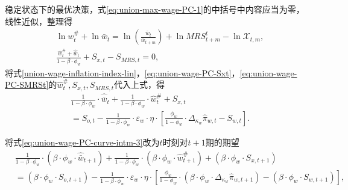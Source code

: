 稳定状态下的最优决策，式\eqref{eq:union-max-wage-PC-1}的中括号中内容应当为零，线性近似，整理得
\begin{align}
&\ln w^{\#}_t + \ln \bar{w}_t  = \ln \left(\frac{\bar{w}_t}{\bar{w}_{t+m}}\right) + \ln MRS_{t+m}^{t} -\ln \mathcal{X}_{t,m}, \nonumber \\
\label{eq:union-wage-PC-curve-intm-2}
&\frac{\hat{w}^{\#}_t + \hat{\bar{w}}_t}{1-\beta \cdot \phi_w}  + S_{x,t} - S_{MRS,t} = 0,
\end{align}
将式\eqref{union-wage-inflation-index-lin}，\eqref{eq:union-wage-PC-Sxt}，\eqref{eq:union-wage-PC-SMRSt}的$\hat{w}^{\#}_t, S_{x,t}, S_{MRS,t}$代入上式，得
\begin{equation}
\label{eq:union-wage-PC-curve-intm-3}
\begin{split}
&\frac{1}{1-\beta \cdot \phi_w} \cdot \hat{\bar{w}}_t + \frac{1}{1-\beta \cdot \phi_w} \cdot  \hat{w}^{\#}_t  + S_{x,t} \\
&= S_{o,t} - \frac{1}{1-\beta \cdot \phi_w} \cdot \varepsilon_w \cdot \eta \cdot \left[
  \frac{\phi_w}{1-\phi_w} \cdot \Delta_{\kappa_w} \hat{\pi}_{w,t} - S_{w,t}
\right].
\end{split}
\end{equation}

将式\eqref{eq:union-wage-PC-curve-intm-3}改为$t$时刻对$t+1$期的期望
\begin{equation}
\label{eq:union-wage-PC-curve-intm-3-1}
\begin{split}
&\frac{1}{1-\beta \cdot \phi_w} \cdot \left(\beta \cdot \phi_w \cdot \hat{\bar{w}}_{t+1}\right) + \frac{1}{1-\beta \cdot \phi_w} \cdot  \left(\beta \cdot \phi_w \cdot \hat{w}^{\#}_{t+1} \right) + \left( \beta \cdot \phi_w \cdot S_{x,t+1}\right) \\
&= \left( \beta \cdot \phi_w \cdot S_{o,t+1} \right) - \frac{1}{1-\beta \cdot \phi_w} \cdot \varepsilon_w \cdot \eta \cdot \left[
  \frac{\phi_w}{1-\phi_w} \cdot \left(\beta \cdot \phi_w \cdot \Delta_{\kappa_w} \hat{\pi}_{w,t+1}\right) - \left( \beta \cdot \phi_w \cdot S_{w,t+1} \right)
\right],
\end{split}
\end{equation}

